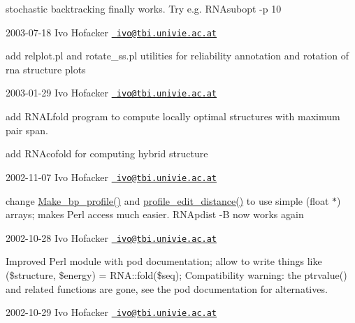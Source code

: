 \begin{DoxyItemize}
\item stochastic backtracking finally works. Try e.\+g. R\+N\+Asubopt -\/p 10
\end{DoxyItemize}

2003-\/07-\/18 Ivo Hofacker \href{mailto:ivo@tbi.univie.ac.at}{\texttt{ ivo@tbi.\+univie.\+ac.\+at}}


\begin{DoxyItemize}
\item add relplot.\+pl and rotate\+\_\+ss.\+pl utilities for reliability annotation and rotation of rna structure plots
\end{DoxyItemize}

2003-\/01-\/29 Ivo Hofacker \href{mailto:ivo@tbi.univie.ac.at}{\texttt{ ivo@tbi.\+univie.\+ac.\+at}}


\begin{DoxyItemize}
\item add R\+N\+A\+Lfold program to compute locally optimal structures with maximum pair span.
\item add R\+N\+Acofold for computing hybrid structure
\end{DoxyItemize}

2002-\/11-\/07 Ivo Hofacker \href{mailto:ivo@tbi.univie.ac.at}{\texttt{ ivo@tbi.\+univie.\+ac.\+at}}


\begin{DoxyItemize}
\item change \mbox{\hyperlink{profiledist_8h_a904c7eaf4a2413567c00ac4891749d18}{Make\+\_\+bp\+\_\+profile()}} and \mbox{\hyperlink{profiledist_8h_abe75e90e00a1e5dd8862944ed53dad5d}{profile\+\_\+edit\+\_\+distance()}} to use simple (float $\ast$) arrays; makes Perl access much easier. R\+N\+Apdist -\/B now works again
\end{DoxyItemize}

2002-\/10-\/28 Ivo Hofacker \href{mailto:ivo@tbi.univie.ac.at}{\texttt{ ivo@tbi.\+univie.\+ac.\+at}}


\begin{DoxyItemize}
\item Improved Perl module with pod documentation; allow to write things like (\$structure, \$energy) = R\+N\+A\+::fold(\$seq); Compatibility warning\+: the ptrvalue() and related functions are gone, see the pod documentation for alternatives.
\end{DoxyItemize}

2002-\/10-\/29 Ivo Hofacker \href{mailto:ivo@tbi.univie.ac.at}{\texttt{ ivo@tbi.\+univie.\+ac.\+at}}


